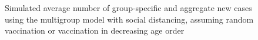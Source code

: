 \documentclass[12pt]{article}
\begin{document}
\begin{figure}[htp]%
\caption
{Simulated average number of group-specific and aggregate new cases using the multigroup model with social distancing, assuming random vaccination or vaccination in decreasing age order}%
\label{fig: vacc_priority}%
\vspace{-0.2cm}%
\footnotesize



\end{figure}
\end{document}
